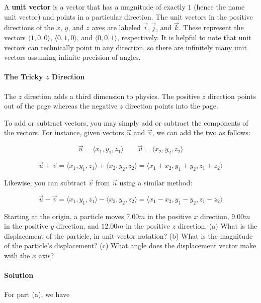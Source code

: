 \documentclass{scrartcl}
\theoremstyle{definition}
\begin{document}
	A \textbf{unit vector} is a vector that has a magnitude of exactly $1$ (hence the name unit vector) and points in a particular direction. The unit vectors in the positive directions of the $x$, $y$, and $z$ axes are labeled $\vec{i}, \vec{j}$, and $\vec{k}$. These represent the vectors $\langle 1,0, 0 \rangle$, $\langle 0,1,0 \rangle$, and $\langle 0,0,1 \rangle$, respectively. It is helpful to note that unit vectors can technically point in any direction, so there are infinitely many unit vectors assuming infinite precision of angles. 
	
	\paragraph{The Tricky $z$ Direction} The $z$ direction adds a third dimension to physics. The positive $z$ direction points out of the page whereas the negative $z$ direction points into the page.
	
	\begin{theorem}
		To add or subtract vectors, you may simply add or subtract the components of the vectors. For instance, given vectors $\vec{u}$ and $\vec{v}$, we can add the two as follows:
		
		$$
		\vec{u}= \langle x_1, y_1, z_1 \rangle \quad \quad \vec{v} = \langle x_2, y_2, z_2 \rangle 
		$$
		
		$$
		\vec{u} + \vec{v} = \langle x_1, y_1, z_1 \rangle + \langle x_2, y_2, z_2 \rangle = \langle x_1 + x_2, y_1 + y_2, z_1 + z_2 \rangle
		$$
		
		\noindent Likewise, you can subtract $\vec{v}$ from $\vec{u}$ using a similar method:
		
		$$
		\vec{u} - \vec{v} = \langle x_1, y_1, z_1 \rangle - \langle x_2, y_2, z_2 \rangle = \langle x_1 - x_2, y_1 - y_2, z_1 - z_2 \rangle
		$$
	\end{theorem}
	
	\begin{example}
		Starting at the origin, a particle moves $7.00 m$ in the positive $x$ direction, $9.00 m$ in the positive $y$ direction, and $12.00m$ in the positive $z$ direction. (a) What is the displacement of the particle, in unit-vector notation? (b) What is the magnitude of the particle's displacement? (c) What angle does the displacement vector make with the $x$ axis?
	\end{example}
	
	\paragraph{Solution} For part (a), we have
	
\end{document}
